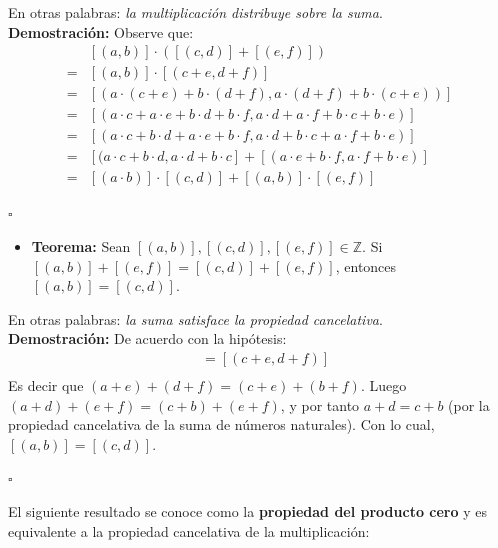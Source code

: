 \documentclass[10 pt]{article}
\begin{document}
\Large{En otras palabras: \textit{la multiplicación distribuye sobre la suma}.} \\

\Large{\textbf{Demostración:} Observe que:}
\begin{align*}
    &[(a,b)] \cdot ([(c,d)]+[(e,f)]) \\
    =&[(a,b)] \cdot [(c+e,d+f)] \\ 
    =&[(a \cdot (c+e)+b \cdot (d+f),a \cdot (d+f)+b \cdot (c+e))] \\
    =&[(a \cdot c+a \cdot e+b \cdot d+b \cdot f,a \cdot d+a \cdot f+b \cdot c+b \cdot e)] \\
    =&[(a \cdot c+b \cdot d+a \cdot e+b \cdot f,a \cdot d+b \cdot c+a \cdot f+b \cdot e)] \\
    =&[(a \cdot c+b \cdot d,a \cdot d+b \cdot c]+[(a \cdot e+b \cdot f,a \cdot f+b \cdot e)] \\
    =&[(a \cdot b)] \cdot [(c,d)]+[(a,b)] \cdot [(e,f)]
\end{align*}

\begin{flushright}
    $\square$
\end{flushright}

\begin{itemize}
    \item \Large{\textbf{Teorema:} Sean $[(a,b)],[(c,d)],[(e,f)] \in \mathbb Z$. Si $[(a,b)]+[(e,f)]=[(c,d)]+[(e,f)]$, entonces $[(a,b)]=[(c,d)]$.} \\
\end{itemize}

\Large{En otras palabras: \textit{la suma satisface la propiedad cancelativa}.} \\

\Large{\textbf{Demostración:} De acuerdo con la hipótesis:}
\begin{align*}
    [(a+e,b+f)]&=[(c+e,d+f)] \\
\end{align*}
\Large{Es decir que $(a+e)+(d+f)=(c+e)+(b+f)$. Luego $(a+d)+(e+f)=(c+b)+(e+f)$, y por tanto $a+d=c+b$ (por la propiedad cancelativa de la suma de números naturales). Con lo cual, $[(a,b)]=[(c,d)]$.} \\

\begin{flushright}
    $\square$
\end{flushright}

\Large{El siguiente resultado se conoce como la \textbf{propiedad del producto cero} y es equivalente a la propiedad cancelativa de la multiplicación:} \\
\end{document}
